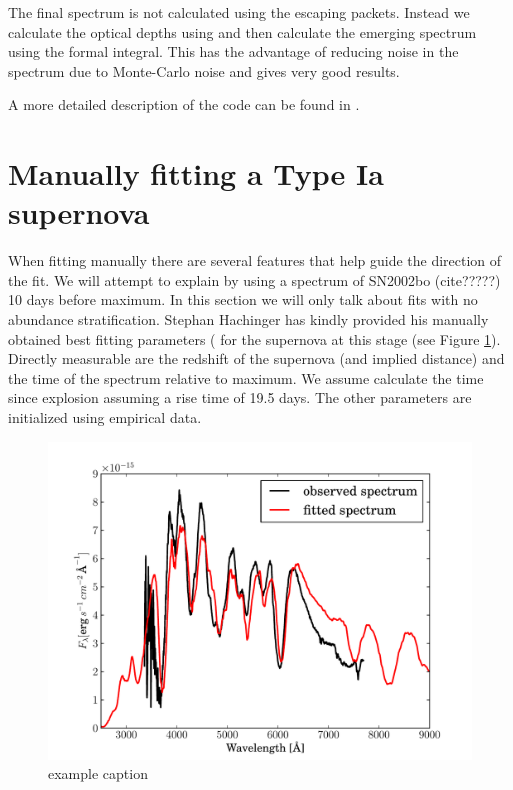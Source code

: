 The final spectrum is not calculated using the escaping packets. Instead we calculate the optical depths using and then calculate the emerging spectrum using the formal integral. 
This has the advantage of reducing noise in the spectrum due to Monte-Carlo noise and gives very good results. 

A more detailed description of the code can be found in  \cite{1993A&A...279..447M,2000A&A...363..705M}.




\section{Manually fitting a Type Ia supernova}

When fitting manually there are several features that help guide the direction of the fit. We will attempt to explain by using a spectrum of SN2002bo (cite?????) 10 days before maximum. In this section we will only talk about fits with no abundance stratification. Stephan Hachinger has kindly provided his manually obtained best fitting parameters ( for the supernova at this stage (see Figure \ref{fig:sn2002bo-10_bf}).
Directly measurable are the redshift of the supernova (and implied distance) and the time of the spectrum relative to maximum. We assume calculate the time since explosion assuming a rise time of 19.5 days.
The other parameters are initialized using empirical data. 

\begin{figure}[htbp] %
   \centering
   \includegraphics[width=\textwidth]{chapter_dalek/plots/bf2002bo-10.pdf} 
   \caption{example caption}
   \label{fig:sn2002bo-10_bf}
\end{figure}

